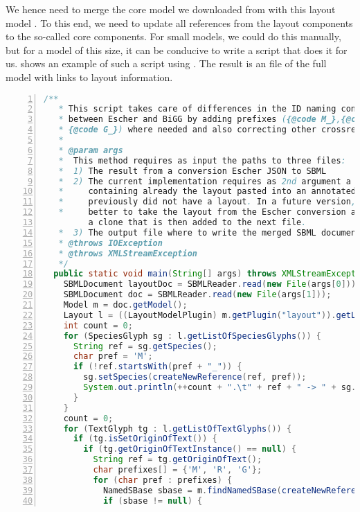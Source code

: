 We hence need to merge the core model we downloaded from \BiGG with this \SBML layout model \citep{Gauges2015}.
To this end, we need to update all references from the layout components to the so-called \SBML core components.
For small models, we could do this manually, but for a model of this size, it can be conducive to write a script that does it for us.
 shows an example of such a script using \JSBML \citep{Rodriguez2015}.
The result is an \SBML file of the full model with links to layout information.
\begin{lstlisting}[language=Java,numbers=left,captionpos=t,caption={Example script for merging an \SBML layout into a model},label={lst:modelMerge}]
  /**
   * This script takes care of differences in the ID naming conventions
   * between Escher and BiGG by adding prefixes ({@code M_},{@code R_}, or
   * {@code G_}) where needed and also correcting other crossreferences.
   *
   * @param args
   *  This method requires as input the paths to three files:
   *  1) The result from a conversion Escher JSON to SBML
   *  2) The current implementation requires as 2nd argument a file
   *     containing already the layout pasted into an annotated model that
   *     previously did not have a layout. In a future version, it would be
   *     better to take the layout from the Escher conversion and to create
         a clone that is then added to the next file.
   *  3) The output file where to write the merged SBML document.
   * @throws IOException
   * @throws XMLStreamException
   */
  public static void main(String[] args) throws XMLStreamException, IOException {
    SBMLDocument layoutDoc = SBMLReader.read(new File(args[0]));
    SBMLDocument doc = SBMLReader.read(new File(args[1]));
    Model m = doc.getModel();
    Layout l = ((LayoutModelPlugin) m.getPlugin("layout")).getListOfLayouts().get(0);
    int count = 0;
    for (SpeciesGlyph sg : l.getListOfSpeciesGlyphs()) {
      String ref = sg.getSpecies();
      char pref = 'M';
      if (!ref.startsWith(pref + "_")) {
        sg.setSpecies(createNewReference(ref, pref));
        System.out.println(++count + ".\t" + ref + " -> " + sg.getSpecies());
      }
    }
    count = 0;
    for (TextGlyph tg : l.getListOfTextGlyphs()) {
      if (tg.isSetOriginOfText()) {
        if (tg.getOriginOfTextInstance() == null) {
          String ref = tg.getOriginOfText();
          char prefixes[] = {'M', 'R', 'G'};
          for (char pref : prefixes) {
            NamedSBase sbase = m.findNamedSBase(createNewReference(ref, pref));
            if (sbase != null) {

\end{lstlisting}
